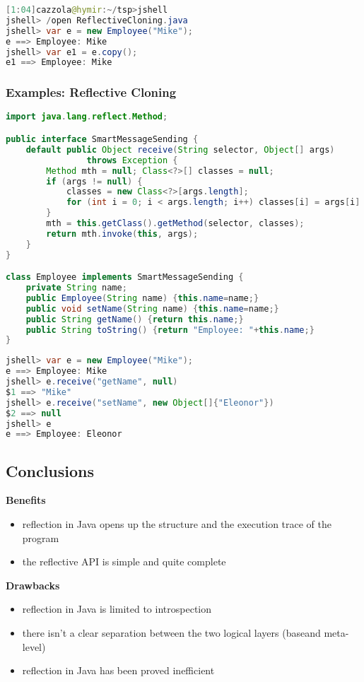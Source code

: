 \begin{lstlisting}[language=Java]
[1:04]cazzola@hymir:~/tsp>jshell
jshell> /open ReflectiveCloning.java
jshell> var e = new Employee("Mike");
e ==> Employee: Mike
jshell> var e1 = e.copy();
e1 ==> Employee: Mike
\end{lstlisting}

\subsubsection{Examples: Reflective Cloning}

\begin{lstlisting}[language=Java]
import java.lang.reflect.Method;

public interface SmartMessageSending {
	default public Object receive(String selector, Object[] args)
				throws Exception {
		Method mth = null; Class<?>[] classes = null;
		if (args != null) {
			classes = new Class<?>[args.length];
			for (int i = 0; i < args.length; i++) classes[i] = args[i].getClass();
		}
		mth = this.getClass().getMethod(selector, classes);
		return mth.invoke(this, args);
	}
}

class Employee implements SmartMessageSending {
	private String name;
	public Employee(String name) {this.name=name;}
	public void setName(String name) {this.name=name;}
	public String getName() {return this.name;}
	public String toString() {return "Employee: "+this.name;}
}
\end{lstlisting}

\begin{lstlisting}[language=Java]
jshell> var e = new Employee("Mike");
e ==> Employee: Mike
jshell> e.receive("getName", null)
$1 ==> "Mike"
jshell> e.receive("setName", new Object[]{"Eleonor"})
$2 ==> null
jshell> e
e ==> Employee: Eleonor
\end{lstlisting}

\subsection{Conclusions}

\textbf{Benefits}
\begin{itemize}
	\item reflection in Java opens up the structure and the execution trace of the program
	\item the reflective API is simple and quite complete
\end{itemize}

\textbf{Drawbacks}
\begin{itemize}
	\item reflection in Java is limited to introspection
	\item there isn’t a clear separation between the two logical layers (baseand meta-level)
	\item reflection in Java has been proved inefficient
\end{itemize}
